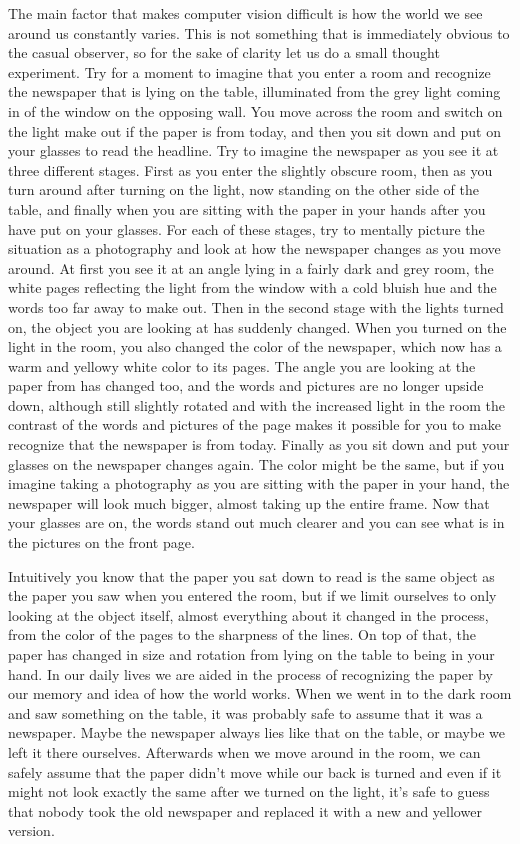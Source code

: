 The main factor that makes computer vision difficult is how the world we 
see around us constantly varies. This is not something that is 
immediately obvious to the casual observer, so for the sake of clarity 
let us do a small thought experiment. Try for a moment to imagine that 
you enter a room and recognize the newspaper that is lying on the table, 
illuminated from the grey light coming in of the window on the opposing 
wall. You move across the room and switch on the light make out if the 
paper is from today, and then you sit down and put on your glasses to 
read the headline. Try to imagine the newspaper as you see it at three 
different stages. First as you enter the slightly obscure room, then as 
you turn around after turning on the light, now standing on the other 
side of the table, and finally when you are sitting with the paper in 
your hands after you have put on your glasses. For each of these stages, 
try to mentally picture the situation as a photography and look at how 
the newspaper changes as you move around. At first you see it at an 
angle lying in a fairly dark and grey room, the white pages reflecting 
the light from the window with a cold bluish hue and the words too far 
away to make out.  Then in the second stage with the lights turned on, 
the object you are looking at has suddenly changed.  When you turned on 
the light in the room, you also changed the color of the newspaper, 
which now has a warm and yellowy white color to its pages.  The angle 
you are looking at the paper from has changed too, and the words and 
pictures are no longer upside down, although still slightly rotated and 
with the increased light in the room the contrast of the words and 
pictures of the page makes it possible for you to make recognize that 
the newspaper is from today.  Finally as you sit down and put your 
glasses on the newspaper changes again. The color might be the same, but 
if you imagine taking a photography as you are sitting with the paper in 
your hand, the newspaper will look much bigger, almost taking up the 
entire frame. Now that your glasses are on, the words stand out much 
clearer and you can see what is in the pictures on the front page.

Intuitively you know that the paper you sat down to read is the same 
object as the paper you saw when you entered the room, but if we limit 
ourselves to only looking at the object itself, almost everything about 
it changed in the process, from the color of the pages to the sharpness 
of the lines. On top of that, the paper has changed in size and rotation 
from lying on the table to being in your hand. In our daily lives we are 
aided in the process of recognizing the paper by our memory and idea of 
how the world works. When we went in to the dark room and saw something 
on the table, it was probably safe to assume that it was a newspaper.  
Maybe the newspaper always lies like that on the table, or maybe we left 
it there ourselves. Afterwards when we move around in the room, we can 
safely assume that the paper didn't move while our back is turned and 
even if it might not look exactly the same after we turned on the light, 
it's safe to guess that nobody took the old newspaper and replaced it 
with a new and yellower version.

